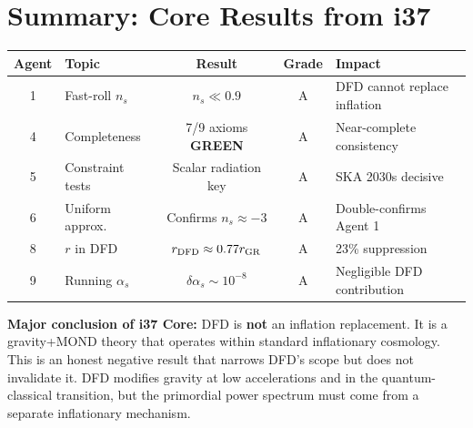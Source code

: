 \documentclass[11pt,a4paper]{article}
\newcommand{\GREEN}{\textcolor{dfdgreen}{\textbf{GREEN}}}
\begin{document}
\newpage
\section{Summary: Core Results from i37}
\label{sec:summary-core}

\begin{center}
\begin{tabular}{clccl}
\toprule
\textbf{Agent} & \textbf{Topic} & \textbf{Result} & \textbf{Grade} & \textbf{Impact} \\
\midrule
1 & Fast-roll $n_s$ & $n_s \ll 0.9$ & A & DFD cannot replace inflation \\
4 & Completeness & 7/9 axioms \GREEN & A & Near-complete consistency \\
5 & Constraint tests & Scalar radiation key & A & SKA 2030s decisive \\
6 & Uniform approx. & Confirms $n_s \approx -3$ & A & Double-confirms Agent 1 \\
8 & $r$ in DFD & $r_{\rm DFD} \approx 0.77 r_{\rm GR}$ & A & 23\% suppression \\
9 & Running $\alpha_s$ & $\delta\alpha_s \sim 10^{-8}$ & A & Negligible DFD contribution \\
\bottomrule
\end{tabular}
\end{center}

\textbf{Major conclusion of i37 Core:} DFD is \textbf{not} an inflation replacement. It is a gravity+MOND theory that operates within standard inflationary cosmology. This is an honest negative result that narrows DFD's scope but does not invalidate it. DFD modifies gravity at low accelerations and in the quantum-classical transition, but the primordial power spectrum must come from a separate inflationary mechanism.
\end{document}
